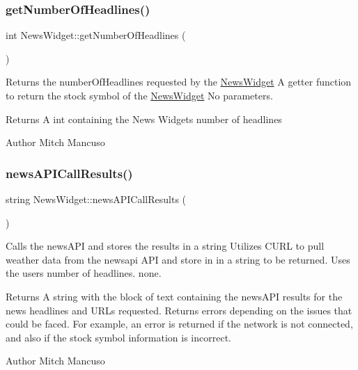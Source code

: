 \subsubsection{\texorpdfstring{get\+Number\+Of\+Headlines()}{getNumberOfHeadlines()}}
{\footnotesize\ttfamily int News\+Widget\+::get\+Number\+Of\+Headlines (\begin{DoxyParamCaption}{ }\end{DoxyParamCaption})}



Returns the number\+Of\+Headlines requested by the \mbox{\hyperlink{class_news_widget}{News\+Widget}}  A getter function to return the stock symbol of the \mbox{\hyperlink{class_news_widget}{News\+Widget}}  No parameters. 

\begin{DoxyReturn}{Returns}
A int containing the News Widget\textquotesingle{}s number of headlines 
\end{DoxyReturn}
\begin{DoxyAuthor}{Author}
Mitch Mancuso 
\end{DoxyAuthor}
\mbox{\label{class_news_widget_a514475c2b2c2f716aed06d0060efee7e}} 
\subsubsection{\texorpdfstring{news\+A\+P\+I\+Call\+Results()}{newsAPICallResults()}}
{\footnotesize\ttfamily string News\+Widget\+::news\+A\+P\+I\+Call\+Results (\begin{DoxyParamCaption}{ }\end{DoxyParamCaption})}



Calls the news\+A\+PI and stores the results in a string  Utilizes C\+U\+RL to pull weather data from the newsapi A\+PI and store in in a string to be returned. Uses the user\textquotesingle{}s number of headlines.  none. 

\begin{DoxyReturn}{Returns}
A string with the block of text containing the news\+A\+PI results for the news headlines and U\+R\+Ls requested. Returns errors depending on the issues that could be faced. For example, an error is returned if the network is not connected, and also if the stock symbol information is incorrect. 
\end{DoxyReturn}
\begin{DoxyAuthor}{Author}
Mitch Mancuso 
\end{DoxyAuthor}
\mbox{\label{class_news_widget_a3a3c9dc6ec6d9e68bf9150ec109f3619}} 
